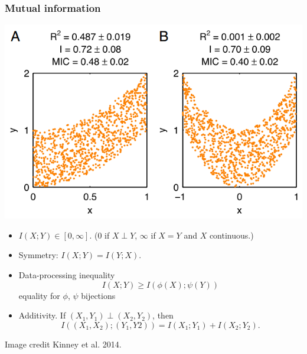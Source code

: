 \documentclass{beamer}
\begin{document}
\begin{frame}
\frametitle{Mutual information}
\begin{center}
\includegraphics[scale = 0.2]{kinney.png}
\end{center}
\begin{itemize}
\item $I(X;Y) \in [0,\infty]$.  (0 if $X \perp Y$, $\infty$ if $X=Y$ and $X$ continuous.)
\item Symmetry: $I(X;Y) = I(Y; X)$.
\item Data-processing inequality
\[I(X; Y) \geq I(\phi(X); \psi(Y))\]
equality for $\phi$, $\psi$ bijections
\item Additivity.  If $(X_1,Y_1) \perp (X_2, Y_2)$, then
\[
I((X_1, X_2); (Y_1, Y2)) = I(X_1; Y_1) + I(X_2; Y_2).
\]
\end{itemize}
\tiny{Image credit Kinney et al. 2014.}
\end{frame}
\end{document}
